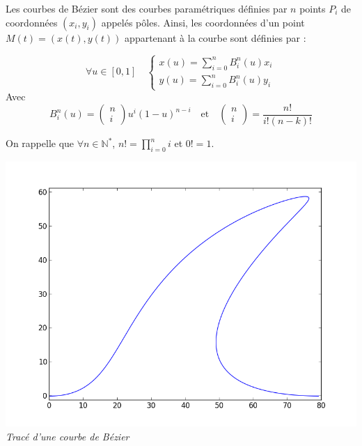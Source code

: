 \documentclass[11pt,oneside]{article}
\begin{document}
Les courbes de Bézier sont des courbes paramétriques définies par $n$ points $P_i$ de coordonnées $\left(x_i,y_i\right)$ appelés pôles. Ainsi, les coordonnées d'un point $M(t)=\left(x(t),y(t)\right)$ appartenant à la courbe sont définies par : 

\begin{minipage}[c]{.45\linewidth}

$$
\forall u \in [0,1] \quad 
\left\{
\begin{array}{l}
x(u)=\sum\limits_{i=0}^{n}B_i^n(u)x_i\\
y(u)=\sum\limits_{i=0}^{n}B_i^n(u)y_i
\end{array}
\right.
$$
Avec 
$$
B_i^n(u)=\left(
\begin{array}{c}
n\\
i
\end{array}\right)u^i\left(1-u \right)^{n-i}
\quad
\text{et}
\quad
\left(
\begin{array}{c}
n\\
i
\end{array}\right)=\dfrac{n!}{i!(n-k)!}
$$

On rappelle que $\forall n\in\mathbb{N^*}$, $n!=\prod\limits_{i=0}^{n}i$ et $0!=1$.


\end{minipage} \hfill
\begin{minipage}[c]{.45\linewidth}
\begin{center}
\includegraphics[width=.9\textwidth]{png/shark.png}
\textit{Tracé d'une courbe de Bézier}
\end{center}
\end{minipage}

\vspace{.5cm}
\end{document}
